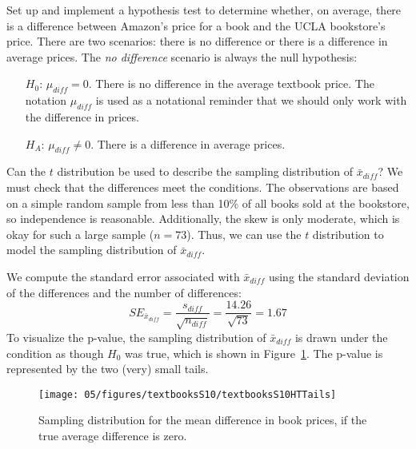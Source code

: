 \begin{example}{Set up and implement a hypothesis test to determine whether, on average, there is a difference between Amazon's price for a book and the UCLA bookstore's price.}
\label{htForDiffInUCLAAndAmazonTextbookPrices}
There are two scenarios: there is no difference or there is a difference in average prices. The \emph{no difference} scenario is always the null hypothesis:
\begin{itemize}
\item[$H_0$:] $\mu_{diff}=0$. There is no difference in the average textbook price. The notation $\mu_{diff}$ is used as a notational reminder that we should only work with the difference in prices.
\item[$H_A$:] $\mu_{diff} \neq 0$. There is a difference in average prices.
\end{itemize}
Can the $t$ distribution be used to describe the sampling distribution of $\bar{x}_{diff}$? We must check that the differences meet the conditions. The observations are based on a simple random sample from less than 10\% of all books sold at the bookstore, so independence is reasonable. Additionally, the skew is only moderate, which is okay for such a large sample ($n=73$). Thus, we can use the $t$ distribution to model the sampling distribution of $\bar{x}_{diff}$.

We compute the standard error associated with $\bar{x}_{diff}$ using the standard deviation of the differences and the number of differences:
$$SE_{\bar{x}_{diff}} = \frac{s_{diff}}{\sqrt{n_{diff}}} = \frac{14.26}{\sqrt{73}} = 1.67$$
To visualize the p-value, the sampling distribution of $\bar{x}_{diff}$ is drawn under the condition as though $H_0$ was true, which is shown in Figure~\ref{textbooksS10HTTails}. The p-value is represented by the two (very) small tails.

\begin{figure}
\centering
\texttt{[image: 05/figures/textbooksS10/textbooksS10HTTails]}
\caption{Sampling distribution for the mean difference in book prices, if the true average difference is zero.}
\label{textbooksS10HTTails}
\end{figure}


\end{example}
